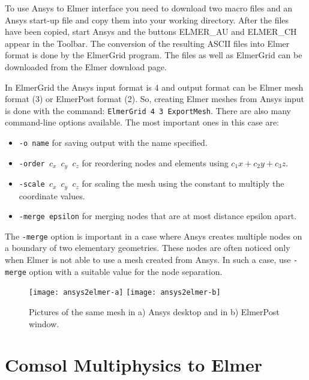 To use Ansys to Elmer interface you need to download two macro files
and an Ansys start-up file and copy them into your working
directory. After the files have been copied, start Ansys and the
buttons ELMER\_AU and ELMER\_CH appear in the Toolbar. The conversion of
the resulting ASCII files into Elmer format is done by the ElmerGrid
program. The files as well as ElmerGrid can be downloaded from the
Elmer download page.

%
%
In ElmerGrid the Ansys input format is 4 and output
format can be Elmer mesh format (3) or ElmerPost format (2). So,
creating Elmer meshes from Ansys input is done with the command:
\texttt{ElmerGrid 4 3 ExportMesh}. There are also many command-line 
options available. The
most important ones in this case are:
%
\begin{itemize}
  \item \texttt{-o name} for saving output with the name specified.  
  \item \texttt{-order $c_x$ $c_y$ $c_z$} for reordering nodes and elements using $c_1x+c_2y +c_3z$.  
  \item \texttt{-scale $c_x$ $c_y$ $c_z$} for scaling the mesh using the constant to multiply
the coordinate values.
  \item \texttt{-merge epsilon} for merging nodes that are at most distance epsilon apart.
\end{itemize}

The \texttt{-merge} option is important in a case where Ansys creates multiple
nodes on a boundary of two elementary geometries. These nodes are
often noticed only when Elmer is not able to use a mesh created from
Ansys. In such a case, use \texttt{-merge} option with a suitable value 
for the node separation.

\begin{figure}[H]
\centering
\texttt{[image: ansys2elmer-a]}
\hspace{10mm}
\texttt{[image: ansys2elmer-b]}
\caption{Pictures of the same mesh in a) Ansys desktop and in b) ElmerPost window.}
\label{fg:pic-ansys}
\end{figure}


\section{Comsol Multiphysics to Elmer}

